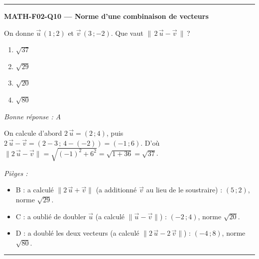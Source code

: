 \documentclass[11pt,a4paper]{article}
\newcommand{\vv}[1]{\vec{#1}}
\begin{document}
\vspace{8pt}\hrule\vspace{8pt}
\noindent\textbf{MATH-F02-Q10 --- Norme d'une combinaison de vecteurs}\par
On donne $\vv{u}\,(1\,;2)$ et $\vv{v}\,(3\,;-2)$. Que vaut $\|\,2\,\vv{u}-\vv{v}\,\|$\,?
\begin{enumerate}[label=\Alph*)]
\item $\sqrt{37}$
\item $\sqrt{29}$
\item $\sqrt{20}$
\item $\sqrt{80}$
\end{enumerate}
\textit{Bonne réponse : A}\par
On calcule d'abord $2\,\vv{u}=(2\,;4)$, puis $2\,\vv{u}-\vv{v}=(2-3\,;\,4-(-2))=(-1\,;6)$. D'où $\|2\,\vv{u}-\vv{v}\|=\sqrt{(-1)^2+6^2}=\sqrt{1+36}=\sqrt{37}$.\par
\textit{Pièges :}
\begin{itemize}
\item B : a calculé $\|2\,\vv{u}+\vv{v}\|$ (a additionné $\vv{v}$ au lieu de le soustraire) : $(5\,;2)$, norme $\sqrt{29}$.
\item C : a oublié de doubler $\vv{u}$ (a calculé $\|\vv{u}-\vv{v}\|$) : $(-2\,;4)$, norme $\sqrt{20}$.
\item D : a doublé les deux vecteurs (a calculé $\|2\,\vv{u}-2\,\vv{v}\|$) : $(-4\,;8)$, norme $\sqrt{80}$.
\end{itemize}
\vspace{8pt}\hrule\vspace{8pt}
\end{document}
